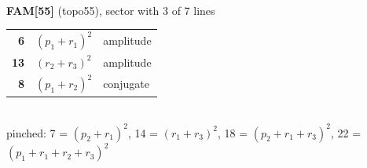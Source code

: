 \documentclass[10pt]{article}
\begin{document}
\begin{minipage}[t]{0.48\textwidth}
{}\\[2mm]\textbf{FAM[55]} (topo55), sector with 3 of 7 lines\\[2pt]{\footnotesize\begin{tabular}{@{}r@{\ \ }l@{\ \ }l@{}}\textbf{6} & $(p_1+r_1)^2$ & amplitude\\
\textbf{13} & $(r_2+r_3)^2$ & amplitude\\
\textbf{8} & $(p_1+r_2)^2$ & conjugate\\\end{tabular}}\\[2pt]{\scriptsize pinched: 7 = $(p_2+r_1)^2$, 14 = $(r_1+r_3)^2$, 18 = $(p_2+r_1+r_3)^2$, 22 = $(p_1+r_1+r_2+r_3)^2$}\end{minipage}\hfill%
\end{document}
